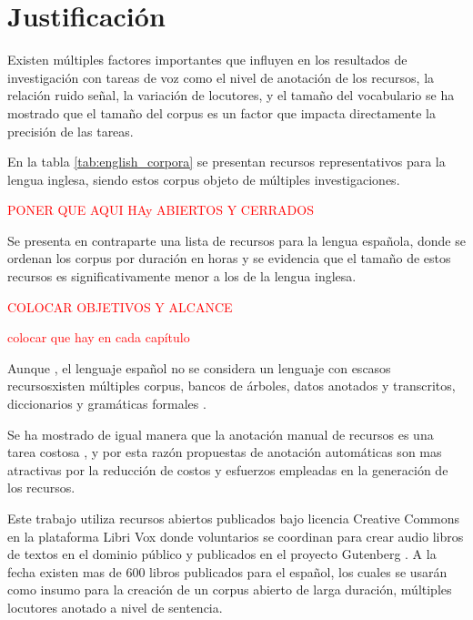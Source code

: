 \section{Justificación}


Existen múltiples factores importantes que influyen en los resultados de investigación con tareas de voz como el nivel de anotación de los recursos, la relación ruido señal, la variación de locutores, y el tamaño del vocabulario se ha mostrado que el tamaño del corpus es un factor que impacta directamente la precisión de las tareas. 

En la tabla \ref{tab:english_corpora} se presentan recursos representativos para la lengua inglesa, siendo estos corpus objeto de múltiples investigaciones. 

\textcolor{red}{PONER QUE AQUI HAy ABIERTOS Y CERRADOS}



Se presenta en contraparte una lista de recursos para la lengua española, donde se ordenan los corpus por duración en horas y se evidencia que el tamaño de estos recursos es significativamente  menor a los de la lengua inglesa.

\textcolor{red}{COLOCAR OBJETIVOS Y ALCANCE}

\textcolor{red}{colocar que hay en cada capítulo}



Aunque , el lenguaje español no se considera un lenguaje con escasos recursosxisten múltiples corpus, bancos de árboles, datos anotados y transcritos, diccionarios y gramáticas formales \cite{CavarGlobalGORILLA}. 

Se ha mostrado de igual manera que la anotación manual de recursos es una tarea costosa \cite{googleTTSLatinAmericanSpanishCorpus}, y por esta razón propuestas de anotación automáticas son mas atractivas por la reducción de costos y esfuerzos empleadas en  la generación de los recursos.

Este trabajo utiliza recursos abiertos publicados bajo licencia Creative Commons en la plataforma Libri Vox \cite{LibriVox} donde voluntarios se coordinan para crear audio libros de textos en el dominio público y publicados en el proyecto Gutenberg \cite{gutenberg}. A la fecha existen mas de 600 libros publicados para el español, los cuales se usarán como insumo para la creación de un corpus abierto de larga duración, múltiples locutores anotado a nivel de sentencia.
